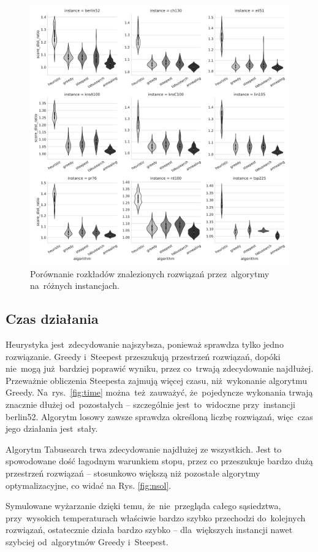 \begin{figure}[H]
\begin{center}
\includegraphics[width=1.0\textwidth]{graphs/score_comparison_violin.pdf}
\end{center}
\caption{Porównanie rozkładów znalezionych rozwiązań przez~algorytmy na~różnych instancjach.}
\label{fig:distribution}
\end{figure}

\subsection{Czas działania}

Heurystyka jest~zdecydowanie najszybsza, ponieważ sprawdza tylko jedno rozwiązanie. Greedy i~Steepest przeszukują przestrzeń rozwiązań, dopóki nie~mogą już~bardziej poprawić wyniku, przez co~trwają zdecydowanie najdłużej. Przeważnie obliczenia Steepesta zajmują więcej czasu, niż~wykonanie algorytmu Greedy. Na~rys.~\ref{fig:time} można~też~zauważyć, że~pojedyncze wykonania trwają znacznie dłużej od~pozostałych -- szczególnie jest~to~widoczne przy~instancji berlin52. Algorytm losowy zawsze sprawdza określoną liczbę rozwiązań, więc~czas jego działania jest~stały.

{\color{part2}
Algorytm Tabusearch trwa zdecydowanie najdłużej ze wszystkich. Jest to spowodowane dość łagodnym warunkiem stopu, przez co przeszukuje bardzo dużą przestrzeń rozwiązań -- stosunkowo większą niż pozostałe algorytmy optymalizacyjne, co widać na Rys. \ref{fig:nsol}.

Symulowane wyżarzanie dzięki temu, że~nie~przegląda całego sąsiedztwa, przy~wysokich temperaturach właściwie bardzo szybko przechodzi do~kolejnych rozwiązań, ostatecznie działa bardzo szybko -- dla~większych instancji nawet szybciej od~algorytmów Greedy i~Steepest.
}

